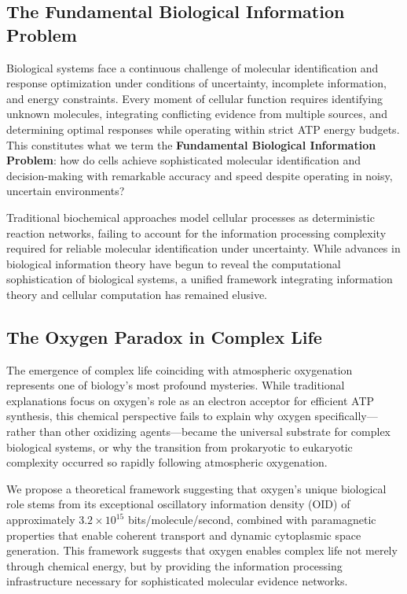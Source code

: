 \documentclass[12pt,a4paper]{article}
\begin{document}
\subsection{The Fundamental Biological Information Problem}

Biological systems face a continuous challenge of molecular identification and response optimization under conditions of uncertainty, incomplete information, and energy constraints. Every moment of cellular function requires identifying unknown molecules, integrating conflicting evidence from multiple sources, and determining optimal responses while operating within strict ATP energy budgets. This constitutes what we term the \textbf{Fundamental Biological Information Problem}: how do cells achieve sophisticated molecular identification and decision-making with remarkable accuracy and speed despite operating in noisy, uncertain environments?

Traditional biochemical approaches model cellular processes as deterministic reaction networks, failing to account for the information processing complexity required for reliable molecular identification under uncertainty. While advances in biological information theory have begun to reveal the computational sophistication of biological systems, a unified framework integrating information theory and cellular computation has remained elusive.

\subsection{The Oxygen Paradox in Complex Life}

The emergence of complex life coinciding with atmospheric oxygenation represents one of biology's most profound mysteries. While traditional explanations focus on oxygen's role as an electron acceptor for efficient ATP synthesis, this chemical perspective fails to explain why oxygen specifically—rather than other oxidizing agents—became the universal substrate for complex biological systems, or why the transition from prokaryotic to eukaryotic complexity occurred so rapidly following atmospheric oxygenation.

We propose a theoretical framework suggesting that oxygen's unique biological role stems from its exceptional oscillatory information density (OID) of approximately $3.2 \times 10^{15}$ bits/molecule/second, combined with paramagnetic properties that enable coherent transport and dynamic cytoplasmic space generation. This framework suggests that oxygen enables complex life not merely through chemical energy, but by providing the information processing infrastructure necessary for sophisticated molecular evidence networks.
\end{document}
